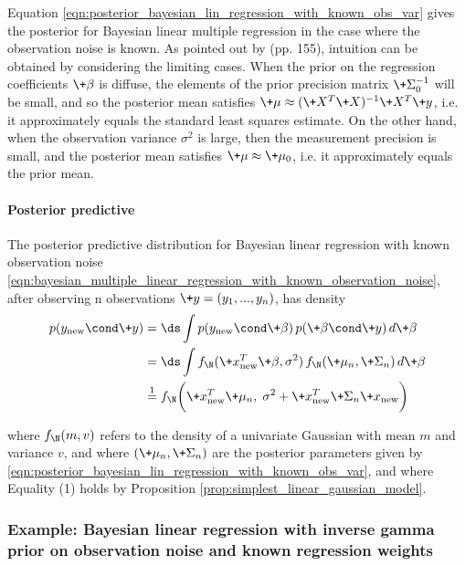 \documentclass{article} %
\newcommand{\new}{\text{new}}
\begin{document}
\begin{remark}{}
Equation \eqref{eqn:posterior_bayesian_lin_regression_with_known_obs_var}
gives the posterior for Bayesian linear multiple regression in the case where the observation noise is known.    As pointed out by \cite{hoff2009first} (pp. 155),  intuition can be obtained by considering the limiting cases.  When the prior on the regression coefficients $\+\beta$ is diffuse,  the elements of the prior precision matrix $\+\Sigma_0^{-1}$ will be small,  and so the posterior mean satisfies
$\+\mu \approx ( \+X^T \+X)^{-1} \+X^T \+y$,  i.e.  it approximately equals the standard least squares estimate.   On the other hand,   when the observation variance $\sigma^2$ is large,  then the measurement precision is small, and the posterior mean satisfies $\+\mu \approx \+\mu_0$,  i.e.  it approximately equals the prior mean.
\end{remark}

\paragraph{Posterior predictive}

The posterior predictive distribution for Bayesian linear regression with known observation noise \eqref{eqn:bayesian_multiple_linear_regression_with_known_observation_noise},   after observing n observations $\+y =(y_1, ..., y_n)$,   has density
\begin{align*}
p(y_\new \cond \+y) &= \ds\int  p(y_\new \cond \+\beta) \, p(\+\beta \cond \+y) \, d\+\beta \\
&= \ds\int f_\N(\+x_\new^T \+\beta,  \sigma^2) \,  f_\N(\+\mu_n,  \+\Sigma_n)  \,  d\+\beta \\
& \stackrel{1}{=} f_\N \bigg( \+x_\new^T \+\mu_n,  \;  \sigma^2 + \+x_\new^T \+\Sigma_n  \+x_\new \bigg) 
\end{align*}

where $f_\N(m,v)$ refers to the density of a univariate Gaussian with mean $m$ and variance $v$, and where $(\+\mu_n, \+\Sigma_n)$ are the posterior parameters given by \eqref{eqn:posterior_bayesian_lin_regression_with_known_obs_var},  and where Equality (1) holds by Proposition \ref{prop:simplest_linear_gaussian_model}.


\subsubsection{Example:  Bayesian linear regression with inverse gamma prior on observation noise and known regression weights} \label{sec:Bayesian_linear_regression_with_IG_prior}
\end{document}
